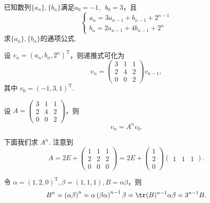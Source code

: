 \begin{exercise}
\begin{exgroup}
        \item 已知数列$\{a_n\},\{b_n\}$满足$a_0=-1,\enspace b_0=3$，且
        \[\begin{cases}
                a_n=3a_{n-1}+b_{n-1}+2^{n-1} \\
                b_n=2a_{n-1}+4b_{n-1}+2^n
            \end{cases}\]
        求$\{a_n\},\{b_n\}$的通项公式.
        \begin{answer}
            设 $v_n = (a_n, b_n, 2^n)^\mathrm{T}$，则递推式可化为
            \[
                v_n = \begin{pmatrix}
                    3 & 1 & 1 \\ 2 & 4 & 2 \\ 0 & 0 & 2
                \end{pmatrix} v_{n-1},
            \]
            其中 $v_0 = (-1, 3, 1)^\mathrm{T}$.

            设 $A = \begin{pmatrix}
                3 & 1 & 1 \\ 2 & 4 & 2 \\ 0 & 0 & 2
            \end{pmatrix}$，则
            \[
                v_n = A^n v_0.
            \]

            下面我们求 $A^n$. 注意到
            \[
                A = 2E + \begin{pmatrix}
                    1 & 1 & 1 \\ 2 & 2 & 2 \\ 0 & 0 & 0
                  \end{pmatrix}
                  = 2E + \begin{pmatrix}
                      1 \\ 2 \\ 0
                  \end{pmatrix} \begin{pmatrix}
                      1 & 1 & 1
                  \end{pmatrix}.
            \]

            令 $\alpha = (1, 2, 0)^\mathrm{T}, \beta = (1, 1, 1), B=\alpha \beta$，则
            \[
                B^n = \left( \alpha \beta \right)^n = \alpha \left( \beta \alpha \right)^{n-1} \beta = \tr(B)^{n-1} \alpha \beta = 3^{n-1} B.
            \]


\end{answer}
\end{exgroup}
\end{exercise}
